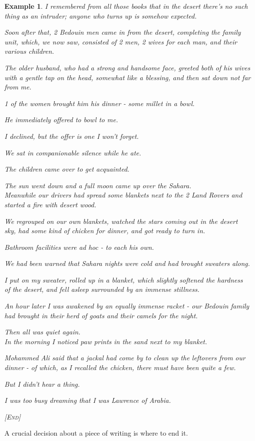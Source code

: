 \documentclass{book}
\numberwithin{equation}{section}
\newtheorem{example}{Example}[chapter]
\begin{document}
\begin{example}
    I remembered from all those books that in the desert there's no such thing as an intruder; anyone who turns up is somehow expected.
    
    Soon after that, 2 Bedouin men came in from the desert, completing the family unit, which, we now saw, consisted of 2 men, 2 wives for each man, and their various children.
    
    The older husband, who had a strong and handsome face, greeted both of his wives with a gentle tap on the head, somewhat like a blessing, and then sat down not far from me.
    
    1 of the women brought him his dinner - some millet in a bowl.
    
    He immediately offered to bowl to me.
    
    I declined, but the offer is one I won't forget.
    
    We sat in companionable silence while he ate.
    
    The children came over to get acquainted.
    
    The sun went down and a full moon came up over the Sahara.
    \\
    
    Meanwhile our drivers had spread some blankets next to the 2 Land Rovers and started a fire with desert wood.
    
    We regrouped on our own blankets, watched the stars coming out in the desert sky, had some kind of chicken for dinner, and got ready to turn in.
    
    Bathroom facilities were ad hoc - to each his own.
    
    We had been warned that Sahara nights were cold and had brought sweaters along.
    
    I put on my sweater, rolled up in a blanket, which slightly softened the hardness of the desert, and fell asleep surrounded by an immense stillness.
    
    An hour later I was awakened by an equally immense racket - our Bedouin family had brought in their herd of goats and their camels for the night.
    
    Then all was quiet again.
    \\
    
    In the morning I noticed paw prints in the sand next to my blanket.
    
    Mohammed Ali said that a jackal had come by to clean up the leftovers from our dinner - of which, as I recalled the chicken, there must have been quite a few.
    
    But I didn't hear a thing.
    
    I was too busy dreaming that I was Lawrence of Arabia.
    \begin{center}
        \textsc{[End]}
    \end{center}
\end{example}
A crucial decision about a piece of writing is where to end it.
\end{document}
